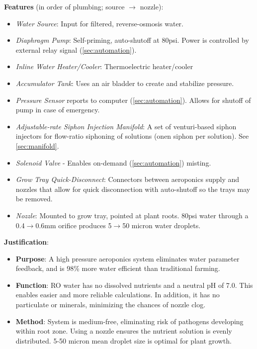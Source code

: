 \documentclass{report}
\begin{document}
\textbf{Features} (in order of plumbing; source $\to$ nozzle):
\begin{itemize}
    \item \textit{Water Source}: Input for filtered, reverse-osmosis water.
    \item \textit{Diaphragm Pump}: Self-priming, auto-shutoff at 80psi. Power is controlled by external relay signal (\ref{sec:automation}).
    \item \textit{Inline Water Heater/Cooler}: Thermoelectric heater/cooler
    \item \textit{Accumulator Tank}: Uses an air bladder to create and stabilize pressure.
    \item \textit{Pressure Sensor} reports to computer (\ref{sec:automation}). Allows for shutoff of pump in case of emergency.
    \item \textit{Adjustable-rate Siphon Injection Manifold}: A set of venturi-based siphon injectors for flow-ratio siphoning of solutions (onen siphon per solution). See \ref{sec:manifold}.
    \item \textit{Solenoid Valve} - Enables on-demand (\ref{sec:automation}) misting.
    \item \textit{Grow Tray Quick-Disconnect}: Connectors between aeroponics supply and nozzles that allow for quick disconnection with auto-shutoff so the trays may be removed.
    \item \textit{Nozzle}: Mounted to grow tray, pointed at plant roots. 80psi water through a 0.4$\to$0.6mm orifice produces 5$\to$50 micron water droplets. %
\end{itemize}

\textbf{Justification}: 
\begin{itemize}
    \item \textbf{Purpose}: A high pressure aeroponics system eliminates water parameter feedback, and is 98\% more water efficient than traditional farming.
    \item \textbf{Function}: RO water has no dissolved nutrients and a neutral pH of 7.0. This enables easier and more reliable calculations. In addition, it has no particulate or minerals, minimizing the chances of nozzle clog.
    \item \textbf{Method}: System is medium-free, eliminating risk of pathogens developing within root zone. Using a nozzle ensures the nutrient solution is evenly distributed. 5-50 micron mean droplet size is optimal for plant growth. %
\end{itemize}
\end{document}
